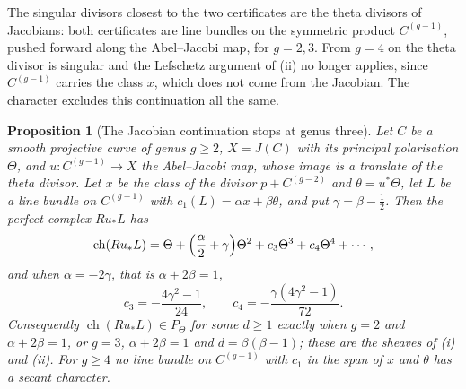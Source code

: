 \documentclass[11pt,reqno]{amsart}
\theoremstyle{plain}
\newtheorem{proposition}[theorem]{Proposition}
\theoremstyle{definition}
\theoremstyle{remark}
\DeclareMathOperator{\ch}{ch}
\begin{document}
The singular divisors closest to the two certificates are the theta divisors
of Jacobians: both certificates are line bundles on the symmetric product
$C^{(g-1)}$, pushed forward along the Abel--Jacobi map, for $g=2,3$. From
$g=4$ on the theta divisor is singular and the Lefschetz argument of
(ii) no longer applies, since $C^{(g-1)}$ carries
the class $x$, which does not come from the Jacobian. The character excludes
this continuation all the same.

\begin{proposition}[The Jacobian continuation stops at genus three]
\label{prop:jacobiancontinuation}
Let $C$ be a smooth projective curve of genus $g\ge2$, $X=J(C)$ with its
principal polarisation $\Theta$, and $u\colon C^{(g-1)}\to X$ the
Abel--Jacobi map, whose image is a translate of the theta divisor. Let $x$
be the class of the divisor $p+C^{(g-2)}$ and $\theta=u^{*}\Theta$, let $L$
be a line bundle on $C^{(g-1)}$ with $c_{1}(L)=\alpha x+\beta\theta$, and put
$\gamma=\beta-\frac12$. Then the perfect complex $Ru_{*}L$ has
\[
  \ch(Ru_{*}L)=\Theta+\Bigl(\frac{\alpha}{2}+\gamma\Bigr)\Theta^{2}
  +c_{3}\Theta^{3}+c_{4}\Theta^{4}+\cdots,
\]
and when $\alpha=-2\gamma$, that is $\alpha+2\beta=1$,
\[
  c_{3}=-\frac{4\gamma^{2}-1}{24},\qquad c_{4}=-\frac{\gamma(4\gamma^{2}-1)}{72}.
\]
Consequently $\ch(Ru_{*}L)\in P_{\Theta}$ for some $d\ge1$ exactly when
$g=2$ and $\alpha+2\beta=1$, or $g=3$, $\alpha+2\beta=1$ and
$d=\beta(\beta-1)$; these are the sheaves of (i)
and (ii). For $g\ge4$ no line bundle on $C^{(g-1)}$ with $c_{1}$ in the span
of $x$ and $\theta$ has a secant character.
\end{proposition}
\end{document}
